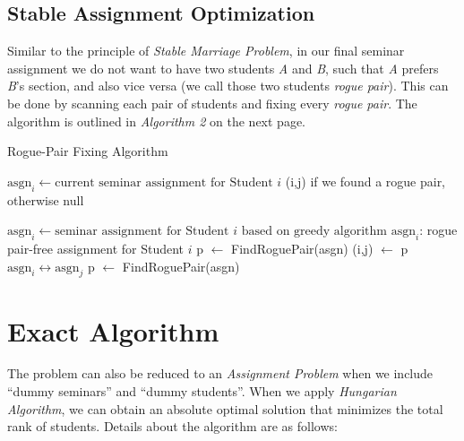 \documentclass{article} %
\begin{document}
\subsection{Stable Assignment Optimization}
    \par Similar to the principle of \emph{Stable Marriage Problem}, in our final seminar assignment we do not want to have two students \emph{A} and \emph{B}, such that \emph{A} prefers \emph{B}'s section, and also vice versa (we call those two students \emph{rogue pair}). This can be done by scanning each pair of students and fixing every \emph{rogue pair}. The algorithm is outlined in \emph{Algorithm 2} on the next page.
    \begin{algorithm}
        \caption{Rogue-Pair Fixing Algorithm}
        \begin{algorithmic}
        \Require $\text{asgn}_i \gets \text{current seminar assignment for Student $i$}$
        \Ensure (i,j) if we found a rogue pair, otherwise null
                    \EndIf
                \EndFor
            \EndFor
        \EndFunction
        
        \null
        
        \Require $\text{asgn}_i \gets \text{seminar assignment for Student $i$ based on greedy algorithm}$
        \Ensure $\text{asgn}_i$: rogue pair-free assignment for Student $i$
                \State p $\gets$ FindRoguePair(asgn)
                    \State (i,j) $\gets$ p
                    \State $\text{asgn}_i \leftrightarrow \text{asgn}_j$
                    \State p $\gets$ FindRoguePair(asgn)
                \EndWhile
        
        \end{algorithmic}
    \end{algorithm}

\section{Exact Algorithm}
    \par\qquad The problem can also be reduced to an \emph{Assignment Problem} when we include ``dummy seminars'' and ``dummy students''. When we apply \emph{Hungarian Algorithm}, we can obtain an absolute optimal solution that minimizes the total rank of students. Details about the algorithm are as follows:
    
\end{document}
